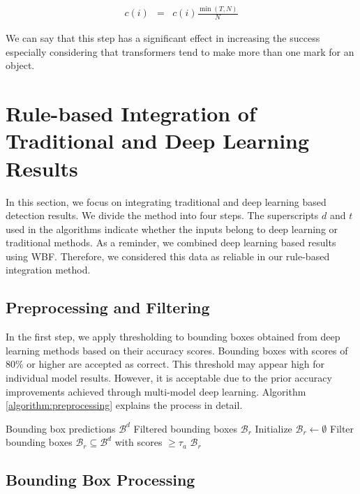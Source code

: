 \documentclass{article}
\begin{document}
\begin{eqnarray}
  c(i) &=& c(i) \frac{\min(T,N)}{N}
\end{eqnarray}

\noindent We can say that this step has a significant effect in increasing the success especially considering that transformers tend to make more than one mark for an object.

\section{Rule-based Integration of Traditional and Deep Learning Results}\label{section:rule-based}

In this section, we focus on integrating traditional and deep learning based detection results. We divide the method into four steps. The superscripts \(d\) and \(t\) used in the algorithms indicate whether the inputs belong to deep learning or traditional methods. As a reminder, we combined deep learning based results using WBF. Therefore, we considered this data as reliable in our rule-based integration method.

\subsection{Preprocessing and Filtering}

In the first step, we apply thresholding to bounding boxes obtained from deep learning methods based on their accuracy scores. Bounding boxes with scores of 80\% or higher are accepted as correct. This threshold may appear high for individual model results. However, it is acceptable due to the prior accuracy improvements achieved through multi-model deep learning. Algorithm \ref{algorithm:preprocessing} explains the process in detail.

\begin{algorithm}[htbp]
\caption{Step 1: Preprocessing.}\label{algorithm:preprocessing}
\begin{algorithmic}[1]
\Require Bounding box predictions $\mathcal{B}^d$
\Ensure Filtered bounding boxes $\mathcal{B}_r$
\State Initialize $\mathcal{B}_r \gets \emptyset$ 
\State Filter bounding boxes $\mathcal{B}_r \subseteq \mathcal{B}^d$ with scores $\geq \tau_a$
\State \Return $\mathcal{B}_r$
\end{algorithmic}
\end{algorithm}

\subsection{Bounding Box Processing}
\end{document}
